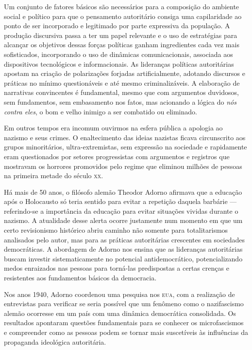 Um conjunto de fatores básicos são necessários para a composição do
ambiente social e político para que o pensamento autoritário consiga uma
capilaridade ao ponto de ser incorporado e legitimado por parte
expressiva da população. A produção discursiva passa a ter um papel
relevante e o uso de estratégias para alcançar os objetivos dessas
forças políticas ganham ingredientes cada vez mais sofisticados,
incorporando o uso de dinâmicas comunicacionais, associada aos
dispositivos tecnológicos e informacionais. As lideranças políticas
autoritárias apostam na criação de polarizações forjadas
artificialmente, adotando discursos e práticas no mínimo questionáveis e
até mesmo criminalizáveis. A elaboração de narrativas convincentes é
fundamental, mesmo que com argumentos duvidosos, sem fundamentos, sem
embasamento nos fatos, mas acionando a lógica do \textit{nós contra eles}, o bom
e velho inimigo a ser combatido ou eliminado.

Em outros tempos era incomum ouvirmos na esfera pública a apologia ao
nazismo e seus crimes. O enaltecimento das ideias nazistas ficava
circunscrito aos grupos minoritários, ultra-extremistas, sem expressão
na sociedade e rapidamente eram questionados por setores progressistas
com argumentos e registros que mostravam os horrores promovidos pelo
regime que eliminou milhões de pessoas na primeira metade do século \textsc{xx}.

Há mais de 50 anos, o filósofo alemão Theodor Adorno afirmava que a
educação após o Holocausto só teria sentido para evitar a repetição
daquela barbárie --- referindo-se a importância da educação para evitar
situações vividas durante o nazismo. A atualidade desse alerta ocorre
justamente num momento em que um certo revisionismo histórico abriu
caminho não somente para totalitarismos analisados pelo autor, mas para
as práticas autoritárias crescentes em sociedades democráticas. A
abordagem de Adorno nos ensina que as lideranças autoritárias buscam
investir sistematicamente no potencial antidemocrático, potencializando
medos enraizados nas pessoas para torná-las predispostas a certas
crenças e resistentes aos fundamentos básicos da democracia.

Nos anos 1940, Adorno coordenou uma pesquisa nos \textsc{eua}, com a realização
de entrevistas para verificar se seria possível que um fenômeno como o
nazifascismo alemão ocorresse em um país com uma dinâmica democrática
consolidada. Os resultados apontaram questões fundamentais para se
conhecer os microfascismos e compreender como as pessoas podem se tornar
mais suscetíveis às influências da propaganda ideológica autoritária.

